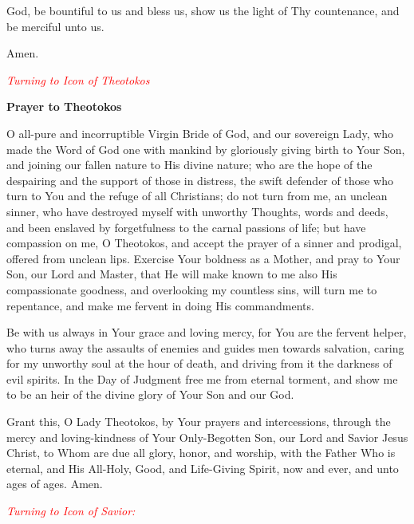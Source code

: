 \documentclass[paper=a6,fontsize=2.3mm]{scrartcl}
\begin{document}
\hangindent=10mm
\noindent{}God, be bountiful to us and bless us, show 
us 
the light of Thy countenance, and be merciful unto us.

\hangindent=10mm
\noindent{}Amen.


\textcolor{red}{\textit{Turning to Icon of Theotokos}}

\newpage
\begin{center}
\textbf{Prayer to Theotokos}
\end{center} 

\noindent{}
\begin{minipage}[t]{\dimexpr \textwidth-10mm}
O all-pure and incorruptible Virgin Bride of God, and our sovereign Lady, who made the Word of God one with mankind by gloriously giving birth to Your Son, and joining our fallen nature to His divine nature; who are the hope of the despairing and the support of those in distress, the swift defender of those who turn to You and the refuge of all Christians; do not turn from me, an unclean sinner, who have destroyed myself with unworthy Thoughts, words and deeds, and been enslaved by forgetfulness to the carnal passions of life; but have compassion on me, O Theotokos, and accept the prayer of a sinner and prodigal, offered from unclean lips.  Exercise Your boldness as a Mother, and pray to Your Son, our Lord and Master, that He will make known to me also His compassionate goodness, and overlooking my countless sins, will turn me to repentance, and make me fervent in doing His commandments.

Be with us always in Your grace and loving mercy, for You are the fervent helper, who turns away the assaults of enemies and guides men towards salvation, caring for my unworthy soul at the hour of death, and driving from it the darkness of evil spirits.  In the Day of Judgment free me from eternal torment, and show me to be an heir of the divine glory of Your Son and our God.

Grant this, O Lady Theotokos, by Your prayers and intercessions, through the mercy and loving-kindness of Your Only-Begotten Son, our Lord and Savior Jesus Christ, to Whom are due all glory, honor, and worship, with the Father Who is eternal, and His All-Holy, Good, and Life-Giving Spirit, now and ever, and unto ages of ages.  Amen.
\end{minipage}

\textcolor{red}{\textit{Turning to Icon of Savior:}}
\end{document}
